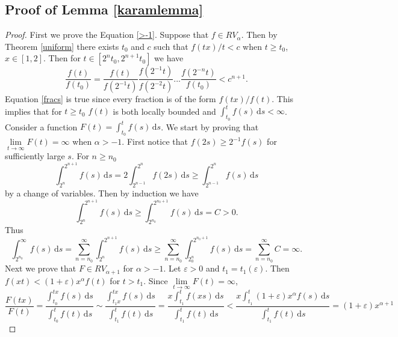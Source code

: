 \documentclass[english,12pt,a4paper,pdftex,sci,utf8]{aaltothesis} %
\begin{document}
\subsection{Proof of Lemma \ref{karamlemma}}

\begin{proof}
First we prove the Equation \eqref{>-1}. Suppose that $f \in RV_{\alpha}$. Then by Theorem \ref{uniform} there exists $t_0$ and $c$ such that $f(tx)/t<c$ when $t \geq t_0$, $x \in [1,2]$. Then for $t \in [2^nt_0, 2^{n+1}t_0]$ we have
\begin{equation}
\frac{f(t)}{f(t_0)}=\frac{f(t)}{f(2^{-1}t)}\frac{f(2^{-1}t)}{f(2^{-2}t)} ... \frac{f(2^{-n}t)}{f(t_0)} < c^{n+1}.
\label{fracs}
\end{equation}
Equation \eqref{fracs} is true since every fraction is of the form $f(tx)/f(t)$. This implies that for $t\geq t_0$ $f(t)$ is both locally bounded and $\int_{t_0}^{t}f(s) \, \mathrm{d}s<\infty$. Consider a function $F(t) = \int_{t_0}^{t}f(s) \, \mathrm{d}s$. We start by proving that $\lim\limits_{t \rightarrow \infty} F(t) = \infty$ when $\alpha>-1$. First notice that $f(2s) \geq 2^{-1}f(s)$ for sufficiently large $s$. For $n\geq n_0$
\begin{equation}
\int_{2^n}^{2^{n+1}} f(s) \, \mathrm{d}s = 2\int_{2^{n-1}}^{2^{n}} f(2s) \, \mathrm{d}s \geq \int_{2^{n-1}}^{2^n} f(s) \, \mathrm{d}s
\label{varchange}
\end{equation}
by a change of variables. Then by induction we have
\begin{equation}
\int_{2^n}^{2^{n+1}} f(s)\, \mathrm{d}s \geq \int_{2^{n_0}}^{2^{n_0+1}} f(s) \, \mathrm{d}s = C > 0.
\label{induction}
\end{equation}
Thus
\begin{equation}
\int_{2^{n_0}}^{\infty} f(s) \, \mathrm{d}s = \sum_{n=n_0}^{\infty} \int_{2^n}^{2^{n+1}} f(s) \, \mathrm{d}s \geq \sum_{n=n_0}^{\infty} \int_{2^n_0}^{2^{n_0+1}} f(s)\, \mathrm{d}s = \sum_{n=n_0}^{\infty} C = \infty.
\label{infinite}
\end{equation}
Next we prove that $F \in RV_{\alpha+1}$ for $\alpha>-1$. Let $\varepsilon>0$ and $t_1=t_1(\varepsilon)$. Then $f(xt)<(1+\varepsilon)x^{\alpha}f(t)$ for $t>t_1$. Since $\lim\limits_{t \rightarrow \infty} F(t)=\infty$,
\begin{equation*}
\frac{F(tx)}{F(t)} = \frac{\int_{t_0}^{tx} f(s) \, \mathrm{d}s}{\int_{t_0}^{t} f(t)\, \mathrm{d}s} \sim \frac{\int_{t_1x}^{tx} f(s)\, \mathrm{d}s}{\int_{t_1}^{t} f(t)\, \mathrm{d}s}=\frac{x\int_{t_1}^{t} f(xs)\, \mathrm{d}s}{\int_{t_1}^{t} f(t)\, \mathrm{d}s} < \frac{x\int_{t_1}^{t}(1+\varepsilon)x^{\alpha} f(s)\, \mathrm{d}s}{\int_{t_1}^{t} f(t)\, \mathrm{d}s} = (1+ \varepsilon)x^{\alpha+1}

\end{equation*}
\end{proof}
\end{document}
